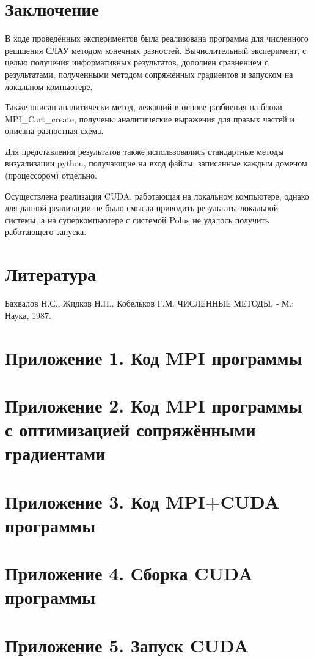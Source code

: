 \documentclass[12pt, fleqn]{article}
\theoremstyle{definition}
\begin{document}
\section{Заключение}
В ходе проведённых экспериментов была реализована программа для численного решшения СЛАУ методом конечных разностей. Вычислительный эксперимент, с целью получения информативных результатов, дополнен сравнением с результатами, полученными методом сопряжённых градиентов и запуском на локальном компьютере.

Также описан аналитически метод, лежащий в основе разбиения на блоки MPI\_Cart\_create, получены аналитические выражения для правых частей и описана разностная схема.

Для представления результатов также использовались стандартные методы визуализации python, получающие на вход файлы, записанные каждым доменом (процессором) отдельно.

Осуществлена реализация CUDA, работающая на локальном компьютере, однако для данной реализации не было смысла приводить результаты локальной системы, а на суперкомпьютере с системой Polus не удалось получить работающего запуска.
\newpage
\section{Литература}
\begin{thebibliography}{}
 Бахвалов Н.С., Жидков Н.П., Кобельков Г.М. ЧИСЛЕННЫЕ МЕТОДЫ. - М.: Наука, 1987.
 
\end{thebibliography}
\newpage
\section{Приложение 1. Код MPI программы}\label{sec:code}
{}
\section{Приложение 2. Код MPI программы с оптимизацией сопряжёнными градиентами}\label{sec:code_cg}
{}
\section{Приложение 3. Код MPI+CUDA программы}\label{sec:code_cuda}
{}
\section{Приложение 4. Сборка CUDA программы}\label{sec:makefile}
{}
\section{Приложение 5. Запуск CUDA}\label{sec:task}
{}
\end{document}
